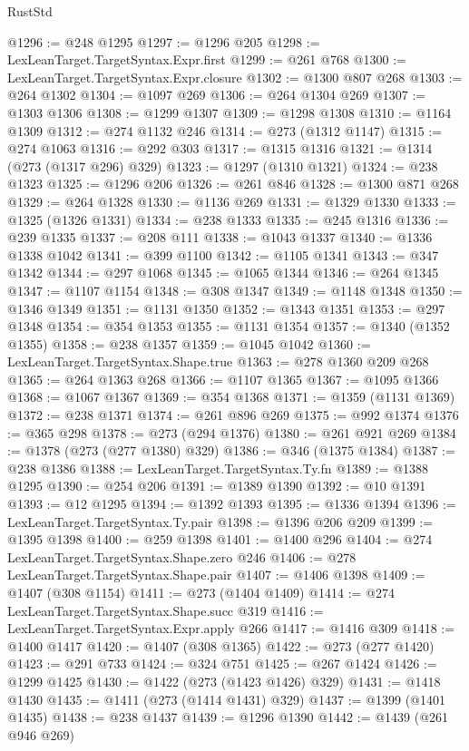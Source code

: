 \begin{lexlean}{RustStd}
\begin{coremodule}
{\begin{coremodule}
{{{{{{{{{{{{{{{{{{{{{{{{{{{{{{{{{{{{{{{{{{{{{{{{{{{{{{{{{{{{{{{{{{{{{{{{{{{{{{{{{{{{{@1296 := @248 @1295
@1297 := @1296 @205
@1298 := LexLeanTarget.TargetSyntax.Expr.first
@1299 := @261 @768
@1300 := LexLeanTarget.TargetSyntax.Expr.closure
@1302 := @1300 @807 @268
@1303 := @264 @1302
@1304 := @1097 @269
@1306 := @264 @1304 @269
@1307 := @1303 @1306
@1308 := @1299 @1307
@1309 := @1298 @1308
@1310 := @1164 @1309
@1312 := @274 @1132 @246
@1314 := @273 (@1312 @1147)
@1315 := @274 @1063
@1316 := @292 @303
@1317 := @1315 @1316
@1321 := @1314 (@273 (@1317 @296) @329)
@1323 := @1297 (@1310 @1321)
@1324 := @238 @1323
@1325 := @1296 @206
@1326 := @261 @846
@1328 := @1300 @871 @268
@1329 := @264 @1328
@1330 := @1136 @269
@1331 := @1329 @1330
@1333 := @1325 (@1326 @1331)
@1334 := @238 @1333
@1335 := @245 @1316
@1336 := @239 @1335
@1337 := @208 @111
@1338 := @1043 @1337
@1340 := @1336 @1338 @1042
@1341 := @399 @1100
@1342 := @1105 @1341
@1343 := @347 @1342
@1344 := @297 @1068
@1345 := @1065 @1344
@1346 := @264 @1345
@1347 := @1107 @1154
@1348 := @308 @1347
@1349 := @1148 @1348
@1350 := @1346 @1349
@1351 := @1131 @1350
@1352 := @1343 @1351
@1353 := @297 @1348
@1354 := @354 @1353
@1355 := @1131 @1354
@1357 := @1340 (@1352 @1355)
@1358 := @238 @1357
@1359 := @1045 @1042
@1360 := LexLeanTarget.TargetSyntax.Shape.true
@1363 := @278 @1360 @209 @268
@1365 := @264 @1363 @268
@1366 := @1107 @1365
@1367 := @1095 @1366
@1368 := @1067 @1367
@1369 := @354 @1368
@1371 := @1359 (@1131 @1369)
@1372 := @238 @1371
@1374 := @261 @896 @269
@1375 := @992 @1374
@1376 := @365 @298
@1378 := @273 (@294 @1376)
@1380 := @261 @921 @269
@1384 := @1378 (@273 (@277 @1380) @329)
@1386 := @346 (@1375 @1384)
@1387 := @238 @1386
@1388 := LexLeanTarget.TargetSyntax.Ty.fn
@1389 := @1388 @1295
@1390 := @254 @206
@1391 := @1389 @1390
@1392 := @10 @1391
@1393 := @12 @1295
@1394 := @1392 @1393
@1395 := @1336 @1394
@1396 := LexLeanTarget.TargetSyntax.Ty.pair
@1398 := @1396 @206 @209
@1399 := @1395 @1398
@1400 := @259 @1398
@1401 := @1400 @296
@1404 := @274 LexLeanTarget.TargetSyntax.Shape.zero @246
@1406 := @278 LexLeanTarget.TargetSyntax.Shape.pair
@1407 := @1406 @1398
@1409 := @1407 (@308 @1154)
@1411 := @273 (@1404 @1409)
@1414 := @274 LexLeanTarget.TargetSyntax.Shape.succ @319
@1416 := LexLeanTarget.TargetSyntax.Expr.apply @266
@1417 := @1416 @309
@1418 := @1400 @1417
@1420 := @1407 (@308 @1365)
@1422 := @273 (@277 @1420)
@1423 := @291 @733
@1424 := @324 @751
@1425 := @267 @1424
@1426 := @1299 @1425
@1430 := @1422 (@273 (@1423 @1426) @329)
@1431 := @1418 @1430
@1435 := @1411 (@273 (@1414 @1431) @329)
@1437 := @1399 (@1401 @1435)
@1438 := @238 @1437
@1439 := @1296 @1390
@1442 := @1439 (@261 @946 @269)
}}}}}}}}}}}}}}}}}}}}}}}}}}}}}}}}}}}}}}}}}}}}}}}}}}}}}}}}}}}}}}}}}}}}}}}}}}}}}}}}}}}}}
\end{coremodule}}
\end{coremodule}
\end{lexlean}
